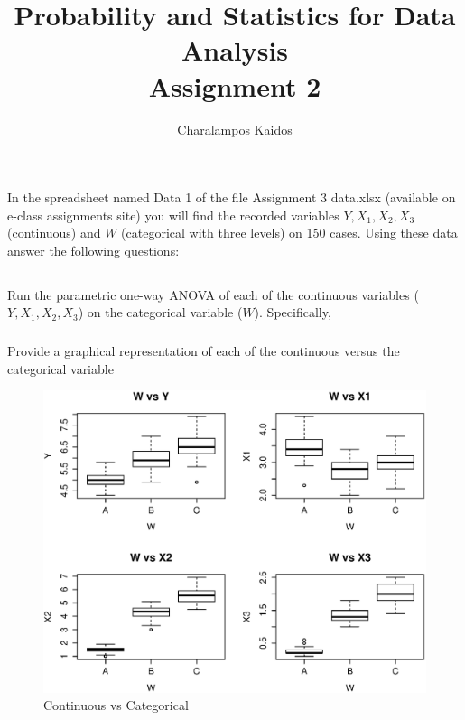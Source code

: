 \documentclass{article}
\begin{document}
\title{Probability and Statistics for Data Analysis\\Assignment 2}
\author{Charalampos Kaidos}

\maketitle

\section{}
In the spreadsheet named Data 1 of the file Assignment 3 data.xlsx (available on
e-class assignments site) you will find the recorded variables $Y, X_1, X_2,
X_3$ (continuous) and $W$ (categorical with three levels) on 150 cases. Using
these data answer the following questions:

\subsection{}
Run the parametric one-way ANOVA of each of the continuous variables ($Y, X_1,
X_2, X_3$) on the categorical variable ($W$). Specifically,

\subsubsection{}
Provide a graphical representation of each of the continuous versus the
categorical variable

\begin{figure}[H]
\centering
\includegraphics[scale=0.6]{valuesvsW.eps}
\caption{Continuous vs Categorical}
\label{fig:valuesvsW}
\end{figure}
\end{document}
